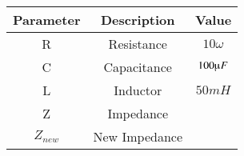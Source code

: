 \begin{tabular}{|c|c|c|}
\hline
   \textbf{Parameter}  & \textbf{Description} & \textbf{Value}\\
   \hline
   R   & Resistance & $10 \omega$\\
   \hline
  C & Capacitance & $100 \micro F$ \\
  \hline
  L & Inductor & $50mH$\\
  \hline
  Z & Impedance & \\
  \hline
  $Z_{new}$ &New Impedance & \\
  \hline
\end{tabular}
